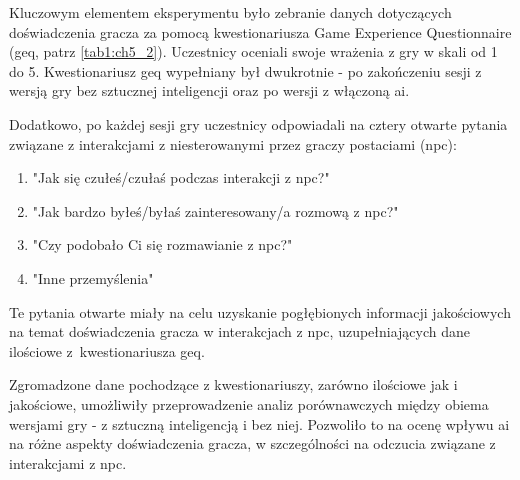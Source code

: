 Kluczowym elementem eksperymentu było zebranie danych dotyczących doświadczenia gracza za pomocą
kwestionariusza Game Experience Questionnaire (\gls{geq}, patrz \ref{tab1:ch5_2}). Uczestnicy oceniali swoje
wrażenia z gry w skali od 1 do 5. Kwestionariusz \gls{geq} wypełniany był dwukrotnie - po zakończeniu sesji z
wersją gry bez sztucznej inteligencji oraz po wersji z włączoną \gls{ai}.

Dodatkowo, po każdej sesji gry uczestnicy odpowiadali na cztery otwarte pytania związane z
interakcjami z niesterowanymi przez graczy postaciami (\gls{npc}):

\begin{enumerate}
    \item "Jak się czułeś/czułaś podczas interakcji z \gls{npc}?"
    \item "Jak bardzo byłeś/byłaś zainteresowany/a rozmową z \gls{npc}?"
    \item "Czy podobało Ci się rozmawianie z \gls{npc}?"
    \item "Inne przemyślenia"
\end{enumerate}

Te pytania otwarte miały na celu uzyskanie pogłębionych informacji jakościowych na temat
doświadczenia gracza w interakcjach z \gls{npc}, uzupełniających dane ilościowe z~kwestionariusza \gls{geq}.

Zgromadzone dane pochodzące z kwestionariuszy, zarówno ilościowe jak i jakościowe, umożliwiły
przeprowadzenie analiz porównawczych między obiema wersjami gry - z sztuczną inteligencją i bez
niej. Pozwoliło to na ocenę wpływu \gls{ai} na różne aspekty doświadczenia gracza, w szczególności na
odczucia związane z interakcjami z \gls{npc}.